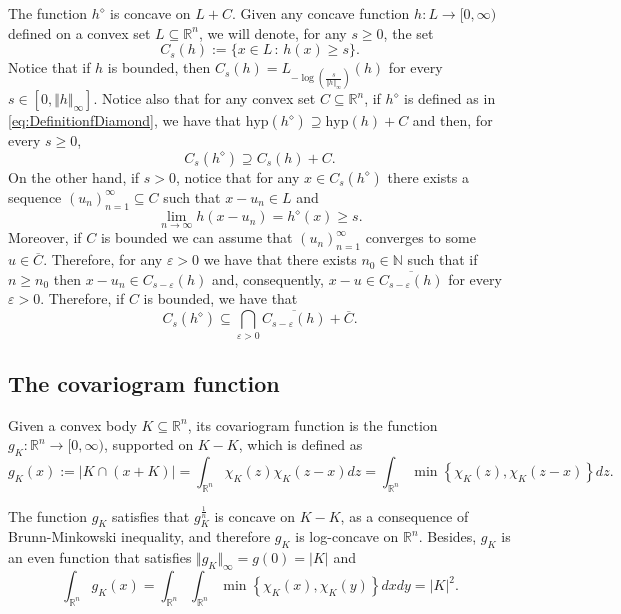\documentclass{amsart}
\newcommand{\R}{\mathbb R}
\newcommand{\N}{\mathbb N}
\theoremstyle{remark}
\theoremstyle{definition}
\numberwithin{equation}{section}
\begin{document}
The function $h^\diamond$ is concave on $L+C$. Given any concave function $h:L\to[0,\infty)$ defined on a convex set $L\subseteq\R^n$, we will denote, for any $s\geq 0$, the set
\begin{equation}\label{eq:DefinitionC_s}
C_s(h):=\{x\in L\,:\, h(x)\geq s\}.
\end{equation}
Notice that if $h$ is bounded, then $C_s(h)=L_{-\log\left(\frac{s}{\Vert h\Vert_\infty}\right)}(h)$ for every $s\in[0,\Vert h\Vert_\infty]$. Notice also that for any convex set $C\subseteq\R^n$, if $h^\diamond$ is defined as in \eqref{eq:DefinitionfDiamond}, we have that $\textrm{hyp}(h^\diamond)\supseteq \textrm{hyp}(h)+C$ and then, for every $s\geq 0$,
\begin{equation}\label{eq:InclusionSuperlevelSetsAsplundConcave}
C_s(h^\diamond)\supseteq C_s(h)+C.
\end{equation}
On the other hand, if $s>0$, notice that for any $x\in C_s(h^\diamond)$ there exists a sequence $(u_n)_{n=1}^\infty\subseteq C$ such that $x-u_n\in L$ and
$$
\lim_{n\to\infty} h(x-u_n)=h^\diamond(x)\geq s.
$$
Moreover, if $C$ is bounded we can assume that $(u_n)_{n=1}^\infty$ converges to some $u\in\overline{C}$. Therefore, for any $\varepsilon>0$ we have that there exists $n_0\in\N$ such that if $n\geq n_0$ then $x-u_n\in C_{s-\varepsilon}(h)$ and, consequently, $x-u\in \overline{C_{s-\varepsilon}(h)}$ for every $\varepsilon>0$. Therefore, if $C$ is bounded, we have that
\begin{equation}\label{eq:InverseInclusionSuperlevelSetsAsplundConcave}
C_s(h^\diamond)\subseteq \bigcap_{\varepsilon>0}\overline{C_{s-\varepsilon}(h)}+\overline{C}.
\end{equation}

\subsection{The covariogram function}


Given a convex body $K\subseteq\R^n$, its covariogram function is the function $g_K:\R^n\to[0,\infty)$, supported on $K-K$, which is defined as
$$
g_K(x):=|K\cap(x+K)|=\int_{\R^n}\chi_K(z)\chi_{K}(z-x)dz=\int_{\R^n}\min\left\{\chi_K(z),\chi_{K}(z-x)\right\}dz.
$$

The function $g_K$ satisfies that $g_K^\frac{1}{n}$ is concave on $K-K$, as a consequence of Brunn-Minkowski inequality, and therefore $g_K$ is log-concave on $\R^n$. Besides, $g_K$ is an even function that satisfies $\Vert g_K\Vert_\infty=g(0)=|K|$ and
\begin{equation}\label{eq:IntegralCovariogram}
\int_{\R^n} g_K(x)=\int_{\R^n}\int_{\R^n}\min\left\{\chi_K(x),\chi_{K}(y)\right\}dxdy=|K|^2.
\end{equation}
\end{document}
